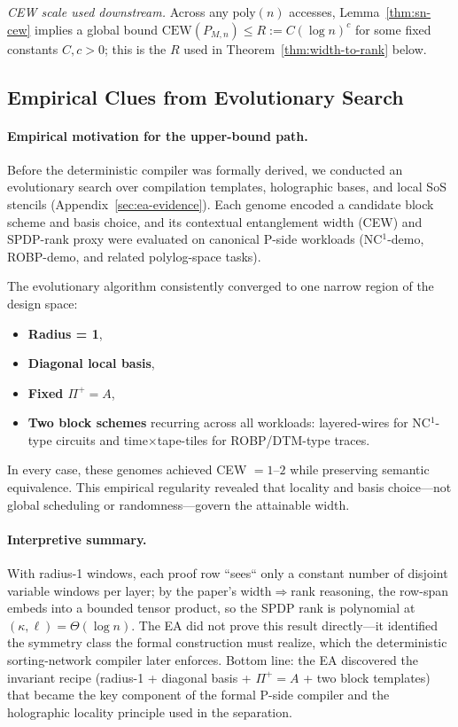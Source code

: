 \documentclass[12pt]{article}
\theoremstyle{definition}
\theoremstyle{definition}
\theoremstyle{remark}
\theoremstyle{remark}
\begin{document}
\noindent\emph{CEW scale used downstream.}
Across any $\mathrm{poly}(n)$ accesses, Lemma~\ref{thm:sn-cew} implies a global bound
$\mathrm{CEW}(P_{M,n}) \le R := C(\log n)^{c}$ for some fixed constants $C,c>0$; this is
the $R$ used in Theorem~\ref{thm:width-to-rank} below.

\subsection{Empirical Clues from Evolutionary Search}

\paragraph{Empirical motivation for the upper-bound path.}
Before the deterministic compiler was formally derived, we conducted an evolutionary search over compilation templates, holographic bases, and local SoS stencils (Appendix~\ref{sec:ea-evidence}). Each genome encoded a candidate block scheme and basis choice, and its contextual entanglement width (CEW) and SPDP-rank proxy were evaluated on canonical P-side workloads (NC$^1$-demo, ROBP-demo, and related polylog-space tasks).

The evolutionary algorithm consistently converged to one narrow region of the design space:
\begin{itemize}
\item \textbf{Radius = 1},
\item \textbf{Diagonal local basis},
\item \textbf{Fixed $\Pi^+ = A$},
\item \textbf{Two block schemes} recurring across all workloads: layered-wires for NC$^1$-type circuits and time$\times$tape-tiles for ROBP/DTM-type traces.
\end{itemize}

In every case, these genomes achieved CEW $= 1$--$2$ while preserving semantic equivalence. This empirical regularity revealed that locality and basis choice---not global scheduling or randomness---govern the attainable width.

\paragraph{Interpretive summary.}
With radius-1 windows, each proof row ``sees`` only a constant number of disjoint variable windows per layer; by the paper's width$\Rightarrow$rank reasoning, the row-span embeds into a bounded tensor product, so the SPDP rank is polynomial at $(\kappa,\ell) = \Theta(\log n)$. The EA did not prove this result directly---it identified the symmetry class the formal construction must realize, which the deterministic sorting-network compiler later enforces. Bottom line: the EA discovered the invariant recipe (radius-1 + diagonal basis + $\Pi^+ = A$ + two block templates) that became the key component of the formal P-side compiler and the holographic locality principle used in the separation.
\end{document}
